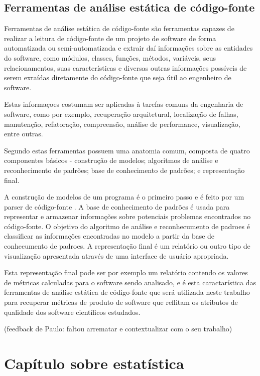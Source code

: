\documentclass[qual, classic, a4paper]{ufbathesis}
\begin{document}
\subsection{Ferramentas de análise estática de código-fonte}

Ferramentas de análise estática de código-fonte são ferramentas capazes de
realizar a leitura de código-fonte de um projeto de software de forma
automatizada ou semi-automatizada e extrair daí informações sobre as entidades
do software, como módulos, classes, funções, métodos, variáveis, seus
relacionamentos, suas características e diversas outras informações possíveis
de serem exraídas diretamente do código-fonte que seja útil ao engenheiro de
software.

Estas informaçoes costumam ser aplicadas à tarefas comuns da engenharia de
software, como por exemplo, recuperação arquitetural, localização de falhas,
manutenção, refatoração, compreensão, análise de performance, visualização,
entre outras.

Segundo  estas ferramentas possuem uma
anatomia comum, composta de quatro componentes básicos - construção de
modelos; algoritmos de análise e reconhecimento de padrões; base de
conhecimento de padrões; e representação final.

A construção de modelos de um programa é o primeiro passo e é feito por um
parser de código-fonte \cite{Binkley2007}. A base de conhecimento de padrões é
usada para representar e armazenar informações sobre potenciais problemas
encontrados no código-fonte. O objetivo do algoritmo de análise e
reconhecumento de padroes é classificar as informações encontradas no modelo a
partir da base de conhecumento de padroes. A representação final é um
relatório ou outro tipo de visualização apresentada através de uma interface
de usuário apropriada.

Esta representação final pode ser por exemplo um relatório contendo os valores
de métricas calculadas para o software sendo analisado, e é esta
caractarística das ferramentas de análise estática de código-fonte que será
utilizada neste trabalho para recuperar métricas de produto de software que
reflitam os atributos de qualidade dos software científicos estudados.

(feedback de Paulo: faltou arrematar e contextualizar com o seu trabalho)

\section{Capítulo sobre estatística}\label{estatistica}
\end{document}
